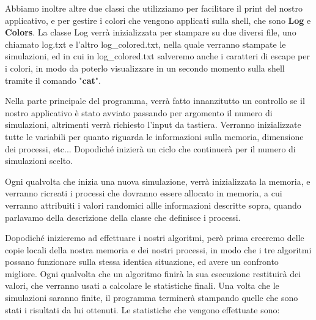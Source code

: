 \documentclass[20pt,a4paper,oneside]{article}
\begin{document}
Abbiamo inoltre altre due classi che utilizziamo per facilitare il print del nostro applicativo, e per gestire i colori che vengono applicati sulla shell, che sono \textbf{Log} e \textbf{Colors}. La classe Log verrà inizializzata per stampare su due diversi file, uno chiamato log.txt e l'altro log\_colored.txt, nella quale verranno stampate le simulazioni, ed in cui in log\_colored.txt salveremo anche i caratteri di escape per i colori, in modo da poterlo visualizzare in un secondo momento sulla shell tramite il comando "\textbf{cat}". \par
Nella parte principale del programma, verrà fatto innanzitutto un controllo se il nostro applicativo è stato avviato passando per argomento il numero di simulazioni, altrimenti verrà richiesto l'input da tastiera. Verranno inizializzate tutte le variabili per quanto riguarda le informazioni sulla memoria, dimensione dei processi, etc... Dopodiché inizierà un ciclo che continuerà per il numero di simulazioni scelto. \par
Ogni qualvolta che inizia una nuova simulazione, verrà inizializzata la memoria, e verranno ricreati i processi che dovranno essere allocato in memoria, a cui verranno attribuiti i valori randomici allle informazioni descritte sopra, quando parlavamo della descrizione della classe che definisce i processi. \par
Dopodiché inizieremo ad effettuare i nostri algoritmi, però prima creeremo delle copie locali della nostra memoria e dei nostri processi, in modo che i tre algoritmi possano funzionare sulla stessa identica situazione, ed avere un confronto migliore. Ogni qualvolta che un algoritmo finirà la sua esecuzione restituirà dei valori, che verranno usati a calcolare le statistiche finali. Una volta che le simulazioni saranno finite, il programma terminerà stampando quelle che sono stati i risultati da lui ottenuti. 
\newpage
Le statistiche che vengono effettuate sono:
\end{document}
